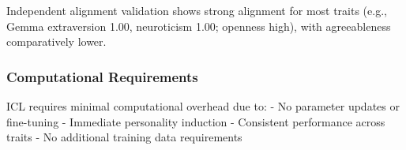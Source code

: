 Independent alignment validation shows strong alignment for most traits (e.g., Gemma extraversion 1.00, neuroticism 1.00; openness high), with agreeableness comparatively lower.

\subsubsection{Computational Requirements}

ICL requires minimal computational overhead due to:
- No parameter updates or fine-tuning
- Immediate personality induction
- Consistent performance across traits
- No additional training data requirements
